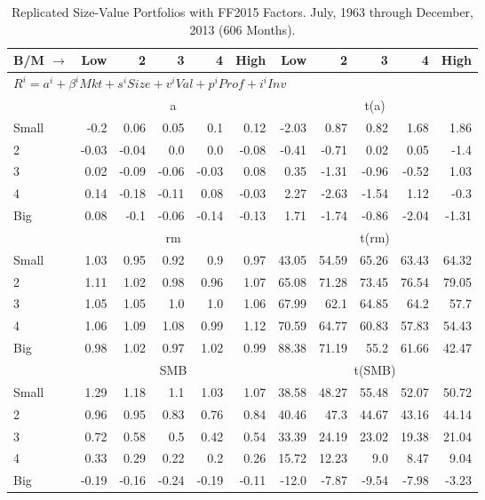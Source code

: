 
\begin{table}[!ht]
\centering
\caption{Replicated Size-Value Portfolios with FF2015 Factors. \footnotesize{July, 1963 through December, 2013 (606 Months).}}
\begin{tabular}{lrrrrrrrrrr}
  \toprule
  B/M $\rightarrow$ & Low & 2 & 3 & 4 & High & Low & 2 & 3 & 4 & High \\ 
  \toprule
  \multicolumn{9}{l}{$R^i=a^i+\beta^iMkt+s^iSize+v^iVal+p^iProf+i^iInv$} \\

  

      & \multicolumn{5}{c}{a} & \multicolumn{5}{c}{t(a)} \\
    \cmidrule(r){2-6} \cmidrule(r){7-11}
      Small  & -0.2  & 0.06  & 0.05  & 0.1  & 0.12   & -2.03  & 0.87  & 0.82  & 1.68  & 1.86  \\
          2  & -0.03  & -0.04  & 0.0  & 0.0  & -0.08   & -0.41  & -0.71  & 0.02  & 0.05  & -1.4  \\
          3  & 0.02  & -0.09  & -0.06  & -0.03  & 0.08   & 0.35  & -1.31  & -0.96  & -0.52  & 1.03  \\
          4  & 0.14  & -0.18  & -0.11  & 0.08  & -0.03   & 2.27  & -2.63  & -1.54  & 1.12  & -0.3  \\
      Big    & 0.08  & -0.1  & -0.06  & -0.14  & -0.13   & 1.71  & -1.74  & -0.86  & -2.04  & -1.31  \\

  

      & \multicolumn{5}{c}{rm} & \multicolumn{5}{c}{t(rm)} \\
    \cmidrule(r){2-6} \cmidrule(r){7-11}
      Small  & 1.03  & 0.95  & 0.92  & 0.9  & 0.97   & 43.05  & 54.59  & 65.26  & 63.43  & 64.32  \\
          2  & 1.11  & 1.02  & 0.98  & 0.96  & 1.07   & 65.08  & 71.28  & 73.45  & 76.54  & 79.05  \\
          3  & 1.05  & 1.05  & 1.0  & 1.0  & 1.06   & 67.99  & 62.1  & 64.85  & 64.2  & 57.7  \\
          4  & 1.06  & 1.09  & 1.08  & 0.99  & 1.12   & 70.59  & 64.77  & 60.83  & 57.83  & 54.43  \\
      Big    & 0.98  & 1.02  & 0.97  & 1.02  & 0.99   & 88.38  & 71.19  & 55.2  & 61.66  & 42.47  \\

  

      & \multicolumn{5}{c}{SMB} & \multicolumn{5}{c}{t(SMB)} \\
    \cmidrule(r){2-6} \cmidrule(r){7-11}
      Small  & 1.29  & 1.18  & 1.1  & 1.03  & 1.07   & 38.58  & 48.27  & 55.48  & 52.07  & 50.72  \\
          2  & 0.96  & 0.95  & 0.83  & 0.76  & 0.84   & 40.46  & 47.3  & 44.67  & 43.16  & 44.14  \\
          3  & 0.72  & 0.58  & 0.5  & 0.42  & 0.54   & 33.39  & 24.19  & 23.02  & 19.38  & 21.04  \\
          4  & 0.33  & 0.29  & 0.22  & 0.2  & 0.26   & 15.72  & 12.23  & 9.0  & 8.47  & 9.04  \\
      Big    & -0.19  & -0.16  & -0.24  & -0.19  & -0.11   & -12.0  & -7.87  & -9.54  & -7.98  & -3.23  \\


\end{tabular}
\end{table}
